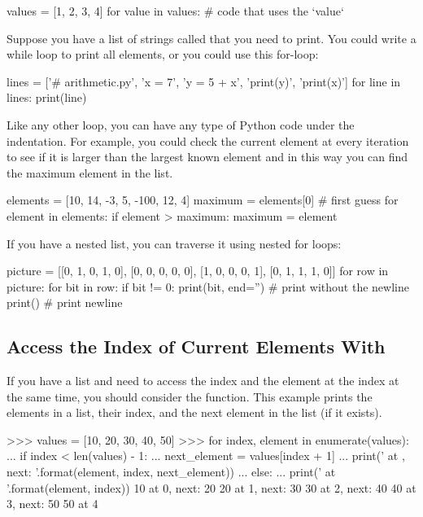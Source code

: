 \documentclass[11pt]{cselabheader}
\begin{document}
\begin{python3code}
values = [1, 2, 3, 4]
for value in values:
    # code that uses the `value`
\end{python3code}

Suppose you have a list of strings called  that
you need to print.  You could write a while loop to print all
 elements, or you could use this for-loop:

\begin{python3code}
lines = ['# arithmetic.py', 'x = 7', 'y = 5 + x',
         'print(y)', 'print(x)']
for line in lines:
    print(line)
\end{python3code}

Like any other loop, you can have any type of Python code
under the indentation. For example, you could check the current element
at every iteration to see if it is larger than the largest known element
and in this way you can find the maximum element in the list.

\begin{python3code}
elements = [10, 14, -3, 5, -100, 12, 4]
maximum = elements[0]  # first guess
for element in elements:
    if element > maximum:
        maximum = element
\end{python3code}

If you have a nested list, you can traverse it using nested
for loops:

\begin{python3code}
picture = [[0, 1, 0, 1, 0],
           [0, 0, 0, 0, 0],
           [1, 0, 0, 0, 1],
           [0, 1, 1, 1, 0]]
for row in picture:
    for bit in row:
        if bit != 0:
            print(bit, end='')  # print without the newline
    print()  # print newline
\end{python3code}


\subsection{\texorpdfstring%
  {Access the Index of Current Elements With }
  {Access the Index of Current Elements With enumerate()}}

If you have a list and need to access the index and the element at the
index at the same time, you should consider the 
function. This example prints the elements in a list, their index,
and the next element in the list (if it exists).

\begin{pyconcode}
>>> values = [10, 20, 30, 40, 50]
>>> for index, element in enumerate(values):
...     if index < len(values) - 1:
...         next_element = values[index + 1]
...         print('{} at {}, next: {}'.format(element, index, next_element))
...     else:
...         print('{} at {}'.format(element, index))
10 at 0, next: 20
20 at 1, next: 30
30 at 2, next: 40
40 at 3, next: 50
50 at 4

\end{pyconcode}
\end{document}
